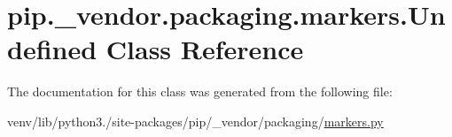 \hypertarget{classpip_1_1__vendor_1_1packaging_1_1markers_1_1Undefined}{}\section{pip.\+\_\+vendor.\+packaging.\+markers.\+Undefined Class Reference}
\label{classpip_1_1__vendor_1_1packaging_1_1markers_1_1Undefined}


The documentation for this class was generated from the following file\+:\begin{DoxyCompactItemize}
\item 
venv/lib/python3./site-\/packages/pip/\+\_\+vendor/packaging/\hyperlink{pip_2__vendor_2packaging_2markers_8py}{markers.\+py}\end{DoxyCompactItemize}
